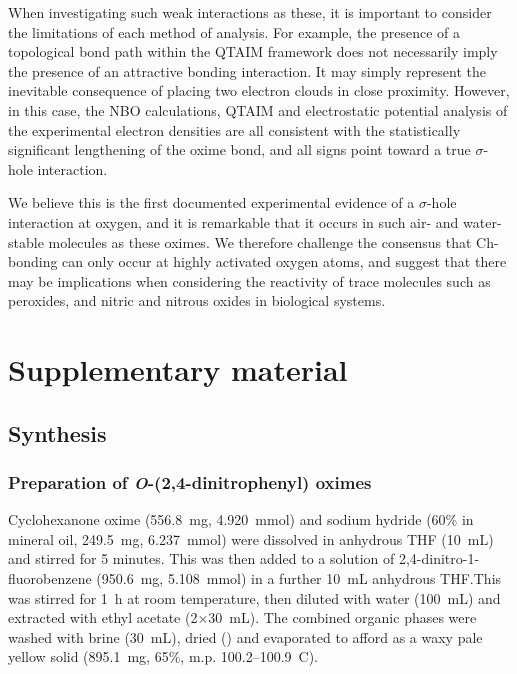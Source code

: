 \begin{refsection}
When investigating such weak interactions as these, it is important to consider the limitations of each method of analysis.
For example, the presence of a topological bond path within the QTAIM framework does not necessarily imply the presence of an attractive bonding interaction.
It may simply represent the inevitable consequence of placing two electron clouds in close proximity.\autocite{Spackman1999,Gatti2005,Bader2009,Cerpa2008,Cerpa2009}
However, in this case, the NBO calculations, QTAIM and electrostatic potential analysis of the experimental electron densities are all consistent with the statistically significant lengthening of the oxime  bond, and all signs point toward a true $\sigma$-hole interaction.

We believe this is the first documented experimental evidence of a $\sigma$-hole interaction at oxygen, and it is remarkable that it occurs in such air- and water-stable molecules as these oximes.
We therefore challenge the consensus that Ch-bonding can only occur at highly activated oxygen atoms, and suggest that there may be implications when considering the reactivity of trace molecules such as peroxides, and nitric and nitrous oxides in biological systems.

\section{Supplementary material}

\subsection{Synthesis}

\subsubsection[Preparation of \refcmpd{cyclohexanone-oxime-dnp,acetone-oxime-dnp}]{Preparation of \emph{O}-(2,4-dinitrophenyl) oximes }
Cyclohexanone oxime (556.8~mg, 4.920~mmol) and sodium hydride (60\% in mineral oil, 249.5~mg, 6.237~mmol) were dissolved in anhydrous THF (10~mL) and stirred for 5 minutes. This was then added to a solution of 2,4-dinitro-1-fluorobenzene (950.6~mg, 5.108~mmol) in a further 10~mL anhydrous THF.\@ This was stirred for 1~h at room temperature, then diluted with water (100~mL) and extracted with ethyl acetate (2$\times$30~mL). The combined organic phases were washed with brine (30~mL), dried () and evaporated to afford  as a waxy pale yellow solid (895.1~mg, 65\%, m.p. 100.2--100.9\degree~C).


\end{refsection}
